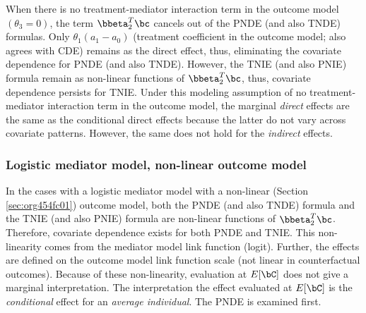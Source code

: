 \documentclass[dvipdfmx,10pt]{article}
\begin{document}
When there is no treatment-mediator interaction term in the outcome model \((\theta_{3} = 0)\), the term \(\bbeta_{2}^{T}\bc\) cancels out of the PNDE (and also TNDE) formulas. Only \(\theta_{1}(a_{1} - a_{0})\) (treatment coefficient in the outcome model; also agrees with CDE) remains as the direct effect, thus, eliminating the covariate dependence for PNDE (and also TNDE). However, the TNIE (and also PNIE) formula remain as non-linear functions of \(\bbeta_{2}^{T}\bc\), thus, covariate dependence persists for TNIE. Under this modeling assumption of no treatment-mediator interaction term in the outcome model, the marginal \emph{direct} effects are the same as the conditional direct effects because the latter do not vary across covariate patterns. However, the same does not hold for the \emph{indirect} effects.

\subsubsection{Logistic mediator model, non-linear outcome model}
\label{sec:org3e9a0fc}
In the cases with a logistic mediator model with a non-linear (Section \ref{sec:org454fc01}) outcome model, both the PNDE (and also TNDE) formula and the TNIE (and also PNIE) formula are non-linear functions of \(\bbeta_{2}^{T}\bc\). Therefore, covariate dependence exists for both PNDE and TNIE. This non-linearity comes from the mediator model link function (logit). Further, the effects are defined on the outcome model link function scale (not linear in counterfactual outcomes). Because of these non-linearity, evaluation at \(E[\bC]\) does not give a marginal interpretation. The interpretation the effect evaluated at \(E[\bC]\) is the \emph{conditional} effect for an \emph{average individual}. The PNDE is examined first.
\end{document}
